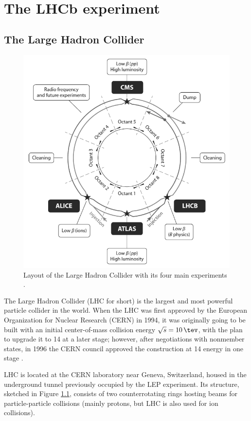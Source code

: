 \chapter{The LHCb experiment}
\label{cap:LHCb}

\section{The Large Hadron Collider}
\label{sec:2:lhc}

\begin{figure}[t]
	\centering
	\includegraphics[width=.6\textwidth]{graphics/02-lhcb/lhc_diagram.png}
	\caption[LHC schematic layout.]{Layout of the Large Hadron Collider with its four main experiments \cite{doi:10.1146/annurev-nucl-102010-130438}.}
	\label{fig:2:lhc_diagram}
\end{figure}

The Large Hadron Collider (LHC for short) is the largest and most powerful particle collider in the world.
When the LHC was first approved by the European Organization for Nuclear Research (CERN) in 1994, it was originally going to be built with an initial center-of-mass collision energy $\sqrt{s} = \SI{10}{\tev}$, with the plan to upgrade it to \SI{14}{\tev} at a later stage;
however, after negotiations with nonmember states, in 1996 the CERN council approved the construction at \SI{14}{\tev} energy in one stage \cite{doi:10.1146/annurev-nucl-102010-130438}.

LHC is located at the CERN laboratory near Geneva, Switzerland, housed in the underground tunnel previously occupied by the LEP experiment.
Its structure, sketched in Figure \ref{fig:2:lhc_diagram}, consists of two counterrotating rings hosting beams for particle-particle collisions (mainly protons, but LHC is also used for ion collisions).

